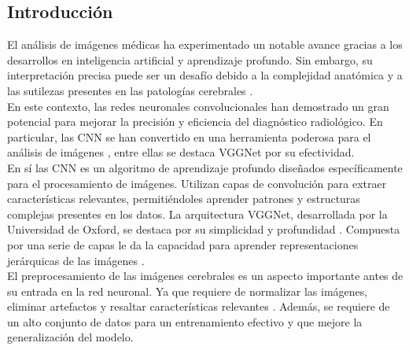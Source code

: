 \documentclass[12pt,twoside,titlepage]{ingenius}
\begin{document}
\begin{multicols}{2}

\section{Introducción}

\vspace{-0.15cm}

% 
%
%

El análisis de imágenes médicas ha experimentado un notable avance gracias a los desarrollos en inteligencia artificial y aprendizaje profundo. Sin embargo, su interpretación precisa puede ser un desafío debido a la complejidad anatómica y a las sutilezas presentes en las patologías cerebrales \cite{1}.\\

En este contexto, las redes neuronales convolucionales han demostrado un gran potencial para mejorar la precisión y eficiencia del diagnóstico radiológico. En particular, las CNN  se han convertido en una herramienta poderosa para el análisis de imágenes \cite{2}, entre ellas se destaca VGGNet  por su efectividad.\\

En sí las CNN es un algoritmo de aprendizaje profundo diseñados específicamente para el procesamiento de imágenes. Utilizan capas de convolución para extraer características relevantes, permitiéndoles aprender patrones y estructuras complejas presentes en los datos. La arquitectura VGGNet, desarrollada por la Universidad de Oxford, se destaca por su simplicidad y profundidad \cite{3}. Compuesta por una serie de capas le da la capacidad para aprender representaciones jerárquicas de las imágenes \cite{3}.\\

El preprocesamiento de las imágenes cerebrales es un aspecto importante antes de su entrada en la red neuronal. Ya que requiere de normalizar las imágenes, eliminar artefactos y resaltar características relevantes \cite{4}. Además, se requiere de un alto conjunto de datos para un entrenamiento efectivo y que mejore la generalización del modelo.\\


\end{multicols}
\end{document}
